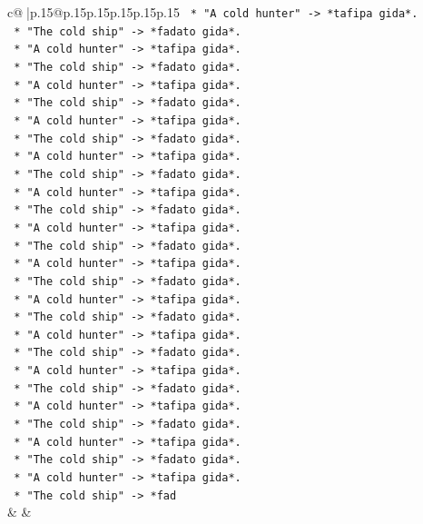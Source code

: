 \documentclass{article}
\begin{document}
{\begin{supertabular}{c@{$\;$}|p{.15\linewidth}@{}p{.15\linewidth}p{.15\linewidth}p{.15\linewidth}p{.15\linewidth}p{.15\linewidth}}
{{{\texttt{        *   "A cold hunter" {-}> *tafipa gida*.} \\
\texttt{        *   "The cold ship" {-}> *fadato gida*.} \\
\texttt{        *   "A cold hunter" {-}> *tafipa gida*.} \\
\texttt{        *   "The cold ship" {-}> *fadato gida*.} \\
\texttt{        *   "A cold hunter" {-}> *tafipa gida*.} \\
\texttt{        *   "The cold ship" {-}> *fadato gida*.} \\
\texttt{        *   "A cold hunter" {-}> *tafipa gida*.} \\
\texttt{        *   "The cold ship" {-}> *fadato gida*.} \\
\texttt{        *   "A cold hunter" {-}> *tafipa gida*.} \\
\texttt{        *   "The cold ship" {-}> *fadato gida*.} \\
\texttt{        *   "A cold hunter" {-}> *tafipa gida*.} \\
\texttt{        *   "The cold ship" {-}> *fadato gida*.} \\
\texttt{        *   "A cold hunter" {-}> *tafipa gida*.} \\
\texttt{        *   "The cold ship" {-}> *fadato gida*.} \\
\texttt{        *   "A cold hunter" {-}> *tafipa gida*.} \\
\texttt{        *   "The cold ship" {-}> *fadato gida*.} \\
\texttt{        *   "A cold hunter" {-}> *tafipa gida*.} \\
\texttt{        *   "The cold ship" {-}> *fadato gida*.} \\
\texttt{        *   "A cold hunter" {-}> *tafipa gida*.} \\
\texttt{        *   "The cold ship" {-}> *fadato gida*.} \\
\texttt{        *   "A cold hunter" {-}> *tafipa gida*.} \\
\texttt{        *   "The cold ship" {-}> *fadato gida*.} \\
\texttt{        *   "A cold hunter" {-}> *tafipa gida*.} \\
\texttt{        *   "The cold ship" {-}> *fadato gida*.} \\
\texttt{        *   "A cold hunter" {-}> *tafipa gida*.} \\
\texttt{        *   "The cold ship" {-}> *fadato gida*.} \\
\texttt{        *   "A cold hunter" {-}> *tafipa gida*.} \\
\texttt{        *   "The cold ship" {-}> *fad} \\
            }
        }
    }
    & & \\ \\


\end{supertabular}}
\end{document}
